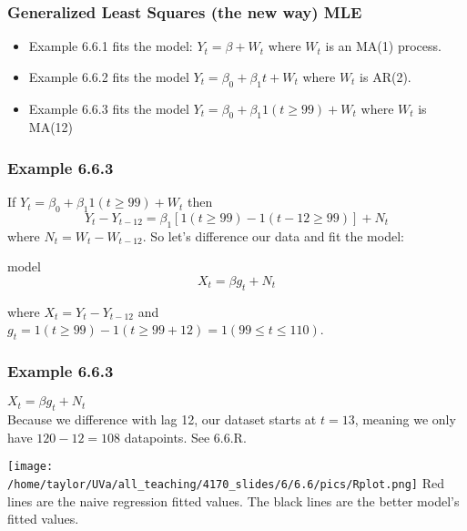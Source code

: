 \documentclass{beamer}
\begin{document}

\begin{frame}
\frametitle{Generalized Least Squares (the new way) MLE}

\begin{itemize}
\item Example 6.6.1 fits the model: $Y_t = \beta + W_t$ where $W_t$ is an MA(1) process.
\item Example 6.6.2 fits the model $Y_t = \beta_0 + \beta_1 t + W_t$ where $W_t$ is AR(2).
\item Example 6.6.3 fits the model $Y_t = \beta_0 + \beta_1 1(t \ge 99) + W_t$ where $W_t$ is MA(12)
\end{itemize}

\end{frame}


\begin{frame}
\frametitle{Example 6.6.3}

If $Y_t = \beta_0 + \beta_1 1(t \ge 99) + W_t$ then 
\[
Y_t - Y_{t-12} = \beta_1 [1(t \ge 99) - 1(t-12 \ge 99)] + N_t 
\]
where $N_t = W_t - W_{t-12}$. So let's difference our data and fit the model:
\begin{block}{model}
\[
X_t = \beta g_t + N_t
\]
\end{block}
where $X_t = Y_t - Y_{t-12}$ and $g_t = 1(t \ge 99) - 1(t \ge 99+12) = 1( 99 \le t \le 110)$. 

\end{frame}


\begin{frame}
\frametitle{Example 6.6.3}

$X_t = \beta g_t + N_t$ \\
Because we difference with lag 12, our dataset starts at $t=13$, meaning we only have $120-12=108$ datapoints. See 6.6.R.

\texttt{[image: /home/taylor/UVa/all\_teaching/4170\_slides/6/6.6/pics/Rplot.png]}
Red lines are the naive regression fitted values. The black lines are the better model's fitted values.

\end{frame}
\end{document}
